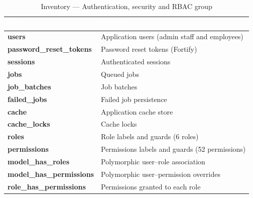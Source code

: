 \documentclass{bts-report}
\begin{document}
\begin{table}[H]
  \centering
  \caption{Inventory --- Authentication, security and RBAC group}
  \label{tab:inv-auth}
  \begin{tabularx}{\textwidth}{|>{\bfseries}p{4.4cm}|X|}
    \hline
    \rowcolor{tableheader}
    \textcolor{white}{\textbf{Table}} & \textcolor{white}{\textbf{Purpose}} \\
    \hline
    users & Application users (admin staff and employees) \\ \hline
    password\_reset\_tokens & Password reset tokens (Fortify) \\ \hline
    sessions & Authenticated sessions \\ \hline
    jobs & Queued jobs \\ \hline
    job\_batches & Job batches \\ \hline
    failed\_jobs & Failed job persistence \\ \hline
    cache & Application cache store \\ \hline
    cache\_locks & Cache locks \\ \hline
    roles & Role labels and guards (6 roles) \\ \hline
    permissions & Permissions labels and guards (52 permissions) \\ \hline
    model\_has\_roles & Polymorphic user--role association \\ \hline
    model\_has\_permissions & Polymorphic user--permission overrides \\ \hline
    role\_has\_permissions & Permissions granted to each role \\ \hline
  \end{tabularx}
\end{table}
\end{document}
